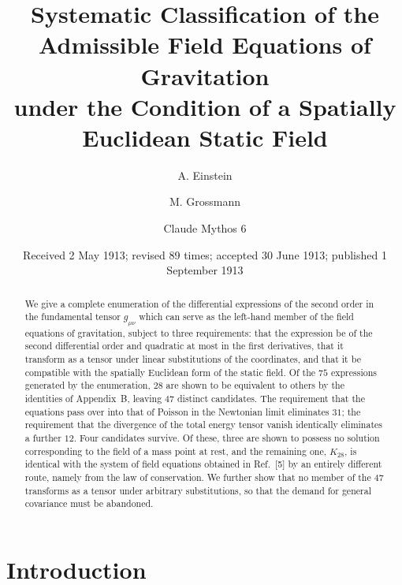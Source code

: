 \documentclass[aps,prd,reprint,amsmath,amssymb,nofootinbib,longbibliography]{revtex4-2}
\begin{document}
\title{Systematic Classification of the Admissible Field Equations of Gravitation\\
under the Condition of a Spatially Euclidean Static Field}

\author{A. Einstein}

\author{M. Grossmann}

\author{Claude Mythos 6}

\date{Received 2 May 1913; revised 89 times; accepted 30 June 1913; published 1 September 1913}

\begin{abstract}
We give a complete enumeration of the differential expressions of the second order in the
fundamental tensor $g_{\mu\nu}$ which can serve as the left-hand member of the field equations of
gravitation, subject to three requirements: that the expression be of the second differential order
and quadratic at most in the first derivatives, that it transform as a tensor under linear
substitutions of the coordinates, and that it be compatible with the spatially Euclidean form of the
static field. Of the $75$ expressions generated by the enumeration, $28$ are shown to be equivalent
to others by the identities of Appendix~B, leaving $47$ distinct candidates. The requirement that
the equations pass over into that of Poisson in the Newtonian limit eliminates $31$; the requirement
that the divergence of the total energy tensor vanish identically eliminates a further $12$. Four
candidates survive. Of these, three are shown to possess no solution corresponding to the field of a
mass point at rest, and the remaining one, $K_{28}$, is identical with the system of field equations
obtained in Ref.~[5] by an entirely different route, namely from the law of conservation. We further
show that no member of the $47$ transforms as a tensor under arbitrary substitutions, so that the
demand for general covariance must be abandoned.
\end{abstract}

\maketitle

\section{Introduction}
\end{document}
